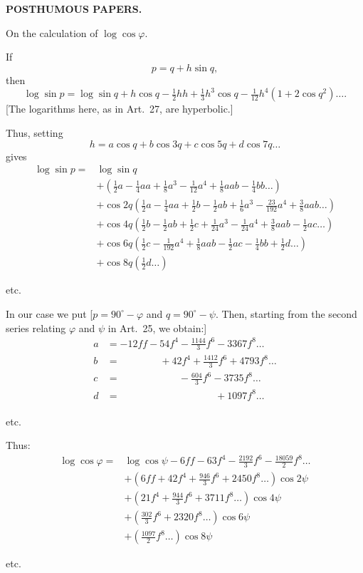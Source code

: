 \par\clearpage
{}\hfill{\small\textbf{POSTHUMOUS PAPERS.}}\hfill\null\par\medskip
{\centering [26.]\par\medskip On the calculation of \(\log\cos\varphi\).\par}
If
\[p=q+h\sin q,\]
\noindent then
\[\log\sin p=\log\sin q+h\cos q-\tfrac12hh+\tfrac13h^3\cos q-\tfrac1{12}h^4(1+2\cos q^2)\ldots.\]
[The logarithms here, as in Art.~27, are hyperbolic.]

Thus, setting
\[h=a\cos q+b\cos3q+c\cos5q+d\cos7q\ldots\]
\noindent gives
\[
\begin{aligned}
\log\sin p={}&\log\sin q\\
&+(\tfrac12a-\tfrac14aa+\tfrac18a^3-\tfrac1{12}a^4+\tfrac18aab-\tfrac14bb\ldots)\\
&+\cos2q(\tfrac12a-\tfrac14aa+\tfrac12b-\tfrac12ab+\tfrac16a^3-\tfrac{23}{192}a^4+\tfrac38aab\ldots)\\
&+\cos4q(\tfrac12b-\tfrac12ab+\tfrac12c+\tfrac1{24}a^3-\tfrac1{24}a^4+\tfrac38aab-\tfrac12ac\ldots)\\
&+\cos6q(\tfrac12c-\tfrac1{192}a^4+\tfrac18aab-\tfrac12ac-\tfrac14bb+\tfrac12d\ldots)\\
&+\cos8q(\tfrac12d\ldots)
\end{aligned}
\]
{\centering etc.\par}
In our case we put [\(p=90^\circ-\varphi\) and \(q=90^\circ-\psi\). Then, starting from the second series relating \(\varphi\) and \(\psi\) in Art.~25, we obtain:]
\[
\begin{aligned}
a&=-12ff-54f^4-\frac{1144}{3}f^6-3367f^8\ldots\\
b&=\phantom{-12ff-}+42f^4+\frac{1412}{3}f^6+4793f^8\ldots\\
c&=\phantom{-12ff-54f^4}-\frac{604}{3}f^6-3735f^8\ldots\\
d&=\phantom{-12ff-54f^4-\frac{1144}{3}f^6}+1097f^8\ldots
\end{aligned}
\]
{\centering etc.\par}
Thus:
\[
\begin{aligned}
\log\cos\varphi={}&\log\cos\psi-6ff-63f^4-\tfrac{2192}{3}f^6-\tfrac{18059}{2}f^8\ldots\\
&+(6ff+42f^4+\tfrac{946}{3}f^6+2450f^8\ldots)\cos2\psi\\
&+(21f^4+\tfrac{944}{3}f^6+3711f^8\ldots)\cos4\psi\\
&+(\tfrac{302}{3}f^6+2320f^8\ldots)\cos6\psi\\
&+(\tfrac{1097}{2}f^8\ldots)\cos8\psi
\end{aligned}
\]
{\centering etc.\par}

